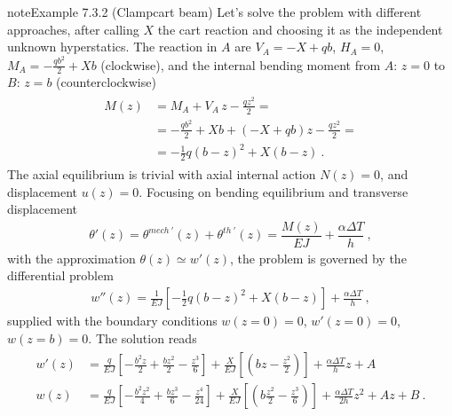 \documentclass[letterpaper,10pt,english]{jupyterBook}
\begin{document}
\begin{sphinxadmonition}{note}{Example 7.3.2 (Clamp\sphinxhyphen{}cart beam)}
\sphinxAtStartPar
Let’s solve the problem with different approaches, after calling \(X\) the cart reaction and choosing it as the independent unknown hyperstatics.
The reaction in \(A\) are \(V_A = - X + qb\), \(H_A = 0\), \(M_A = - \frac{qb^2}{2} + Xb\) (clockwise), and the internal bending moment from \(A: \, z=0\) to \(B: \, z=b\) (counter\sphinxhyphen{}clockwise)
\begin{equation*}
\begin{split}\begin{aligned}
  M(z)
  & = M_A + V_A \, z - \frac{q z^2}{2} = \\
  & = -\frac{qb^2}{2} + Xb + \left( - X + qb \right) z - \frac{q z^2}{2} = \\
  & = -\frac{1}{2} q \left( b - z \right)^2 + X ( b - z ) \ .
\end{aligned}\end{split}
\end{equation*}
\sphinxAtStartPar
{} The axial equilibrium is trivial with axial internal action \(N(z) = 0\), and displacement \(u(z) = 0\). Focusing on bending equilibrium and transverse displacement
\begin{equation*}
\begin{split}\theta'(z) = \theta^{mech \ '}(z) + \theta^{th \ '}(z) = \dfrac{M(z)}{EJ} + \dfrac{\alpha \Delta T}{h} \ ,\end{split}
\end{equation*}
\sphinxAtStartPar
with the approximation \(\theta(z) \simeq w'(z)\), the problem is governed by the differential problem
\begin{equation*}
\begin{split}
  w''(z) = \frac{1}{EJ} \left[  -\frac{1}{2} q \left( b - z \right)^2 + X ( b - z ) \right] + \frac{\alpha \Delta T}{h} \ ,
\end{split}
\end{equation*}
\sphinxAtStartPar
supplied with the boundary conditions \(w(z=0) = 0\), \(w'(z=0) = 0\), \(w(z=b) = 0\). The solution reads
\begin{equation*}
\begin{split}\begin{aligned}
  w'(z) & = \frac{q}{EJ} \left[ - \frac{b^2 z}{2} + \frac{b z^2}{2} - \frac{z^3}{6} \right] + \frac{X}{EJ} \left[ \left( bz - \frac{z^2}{2} \right) \right] + \frac{\alpha \Delta T}{h}z + A \\
  w (z) & = \frac{q}{EJ} \left[ - \frac{b^2 z^2}{4} + \frac{b z^3}{6} - \frac{z^4}{24} \right] + \frac{X}{EJ} \left[ \left( b \frac{z^2}{2} - \frac{z^3}{6} \right) \right] + \frac{\alpha \Delta T}{2h}z^2 + Az + B \ .

\end{aligned}
\end{split}
\end{equation*}
\end{sphinxadmonition}
\end{document}
